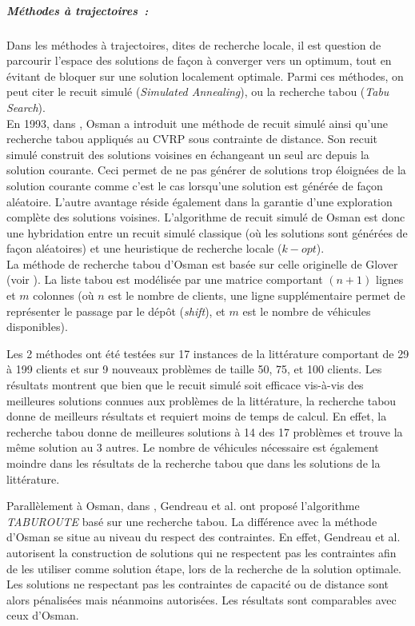 \subparagraph{Méthodes à trajectoires~:\\}

Dans les méthodes à trajectoires, dites de recherche locale, il est question de parcourir l'espace des solutions de façon à converger vers un optimum, tout en évitant de bloquer sur une solution localement optimale. Parmi ces méthodes, on peut citer le recuit simulé (\textit{Simulated Annealing}), ou la recherche tabou (\textit{Tabu Search}).\\

En 1993, dans \cite{Osman1993}, Osman a introduit une méthode de recuit simulé ainsi qu'une recherche tabou appliqués au CVRP sous contrainte de distance. Son recuit simulé construit des solutions voisines en échangeant un seul arc depuis la solution courante. Ceci permet de ne pas générer de solutions trop éloignées de la solution courante comme c'est le cas lorsqu'une solution est générée de façon aléatoire. L'autre avantage réside également dans la garantie d'une exploration complète des solutions voisines. L'algorithme de recuit simulé de Osman est donc une hybridation entre un recuit simulé classique (où les solutions sont générées de façon aléatoires) et une heuristique de recherche locale ($k-opt$).\\

La méthode de recherche tabou d'Osman est basée sur celle originelle de Glover (voir \cite{Glover1989,Glover1990}). La liste tabou est modélisée par une matrice comportant $(n+1)$ lignes et $m$ colonnes (où $n$ est le nombre de clients, une ligne supplémentaire permet de représenter le passage par le dépôt (\textit{shift}), et $m$ est le nombre de véhicules disponibles).

Les 2 méthodes ont été testées sur 17 instances de la littérature comportant de 29 à 199 clients et sur 9 nouveaux problèmes de taille 50, 75, et 100 clients. Les résultats montrent que bien que le recuit simulé soit efficace vis-à-vis des meilleures solutions connues aux problèmes de la littérature, la recherche tabou donne de meilleurs résultats et requiert moins de temps de calcul. En effet, la recherche tabou donne de meilleures solutions à 14 des 17 problèmes et trouve la même solution au 3 autres. Le nombre de véhicules nécessaire est également moindre dans les résultats de la recherche tabou que dans les solutions de la littérature.

Parallèlement à Osman, dans \cite{Gendreau1994}, Gendreau et al. ont proposé l'algorithme \textit{TABUROUTE} basé sur une recherche tabou. La différence avec la méthode d'Osman se situe au niveau du respect des contraintes. En effet, Gendreau et al. autorisent la construction de solutions qui ne respectent pas les contraintes afin de les utiliser comme solution étape, lors de la recherche de la solution optimale. Les solutions ne respectant pas  les contraintes de capacité ou de distance sont alors pénalisées mais néanmoins autorisées. Les résultats sont comparables avec ceux d'Osman.

